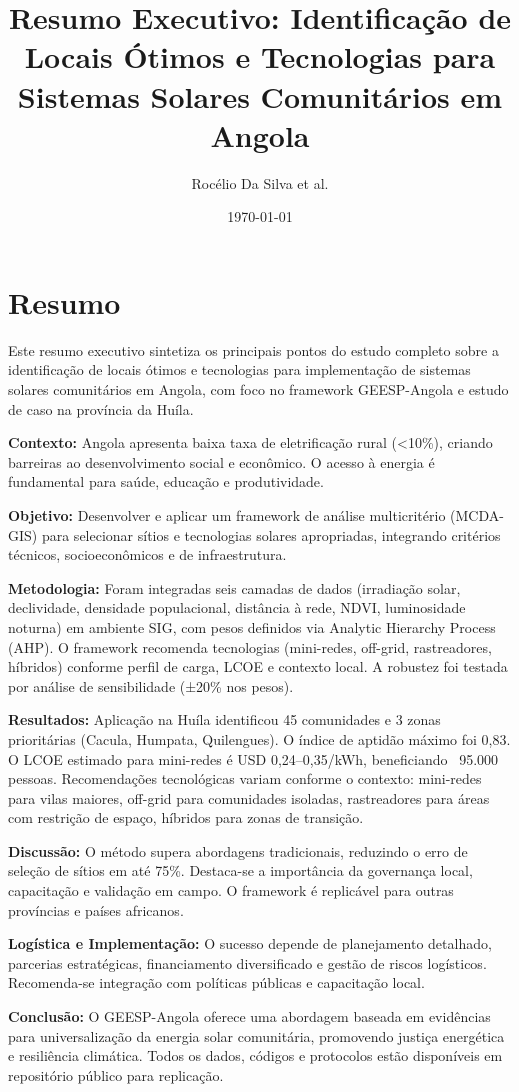 \documentclass[12pt, a4paper]{article}
\begin{document}
\title{Resumo Executivo: Identificação de Locais Ótimos e Tecnologias para Sistemas Solares Comunitários em Angola}
\author{Rocélio Da Silva et al.}
\date{\today}
\maketitle

\section*{Resumo}
Este resumo executivo sintetiza os principais pontos do estudo completo sobre a identificação de locais ótimos e tecnologias para implementação de sistemas solares comunitários em Angola, com foco no framework GEESP-Angola e estudo de caso na província da Huíla.

\textbf{Contexto:} Angola apresenta baixa taxa de eletrificação rural (<10\%), criando barreiras ao desenvolvimento social e econômico. O acesso à energia é fundamental para saúde, educação e produtividade.

\textbf{Objetivo:} Desenvolver e aplicar um framework de análise multicritério (MCDA-GIS) para selecionar sítios e tecnologias solares apropriadas, integrando critérios técnicos, socioeconômicos e de infraestrutura.

\textbf{Metodologia:} Foram integradas seis camadas de dados (irradiação solar, declividade, densidade populacional, distância à rede, NDVI, luminosidade noturna) em ambiente SIG, com pesos definidos via Analytic Hierarchy Process (AHP). O framework recomenda tecnologias (mini-redes, off-grid, rastreadores, híbridos) conforme perfil de carga, LCOE e contexto local. A robustez foi testada por análise de sensibilidade (±20\% nos pesos).

\textbf{Resultados:} Aplicação na Huíla identificou 45 comunidades e 3 zonas prioritárias (Cacula, Humpata, Quilengues). O índice de aptidão máximo foi 0,83. O LCOE estimado para mini-redes é USD 0,24–0,35/kWh, beneficiando ~95.000 pessoas. Recomendações tecnológicas variam conforme o contexto: mini-redes para vilas maiores, off-grid para comunidades isoladas, rastreadores para áreas com restrição de espaço, híbridos para zonas de transição.

\textbf{Discussão:} O método supera abordagens tradicionais, reduzindo o erro de seleção de sítios em até 75\%. Destaca-se a importância da governança local, capacitação e validação em campo. O framework é replicável para outras províncias e países africanos.

\textbf{Logística e Implementação:} O sucesso depende de planejamento detalhado, parcerias estratégicas, financiamento diversificado e gestão de riscos logísticos. Recomenda-se integração com políticas públicas e capacitação local.

\textbf{Conclusão:} O GEESP-Angola oferece uma abordagem baseada em evidências para universalização da energia solar comunitária, promovendo justiça energética e resiliência climática. Todos os dados, códigos e protocolos estão disponíveis em repositório público para replicação.
\end{document}
